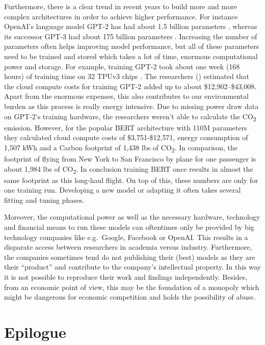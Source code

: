\documentclass[
]{krantz}
\begin{document}
Furthermore, there is a clear trend in recent years to build more and more complex architectures in order to achieve higher performance. For instance OpenAI's language model GPT-2 has had about 1.5 billion parameters \citep{Radford2019LanguageMA}, whereas its successor GPT-3 had about 175 billion parameters \citep{GPT3}. Increasing the number of parameters often helps improving model performance, but all of these parameters need to be trained and stored which takes a lot of time, enormous computational power and storage. For example, training GPT-2 took about one week (168 hours) of training time on 32 TPUv3 chips \citep{environment}. The researchers (\citet{environment}) estimated that the cloud compute costs for training GPT-2 added up to about \$12,902--\$43,008. Apart from the enormous expenses, this also contributes to our environmental burden as this process is really energy intensive. Due to missing power draw data on GPT-2's training hardware, the researchers weren't able to calculate the CO\textsubscript{2} emission. However, for the popular BERT architecture with 110M parameters they calculated cloud compute costs of \$3,751-\$12,571, energy consumption of 1,507 kWh and a Carbon footprint of 1,438 lbs of CO\textsubscript{2}. In comparison, the footprint of flying from New York to San Francisco by plane for one passenger is about 1,984 lbs of CO\textsubscript{2}. In conclusion training BERT once results in almost the same footprint as this long-haul flight. On top of this, these numbers are only for one training run. Developing a new model or adapting it often takes several fitting and tuning phases.

Moreover, the computational power as well as the necessary hardware, technology and financial means to run these models can oftentimes only be provided by big technology companies like e.g.~Google, Facebook or OpenAI. This results in a disparate access between researchers in academia versus industry. Furthermore, the companies sometimes tend do not publishing their (best) models as they are their ``product'' and contribute to the company's intellectual property. In this way it is not possible to reproduce their work and findings independently. Besides, from an economic point of view, this may be the foundation of a monopoly which might be dangerous for economic competition and holds the possibility of abuse.

\hypertarget{epilogue}{%
\chapter{Epilogue}\label{epilogue}}
\end{document}
